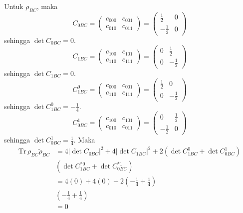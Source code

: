 Untuk $\rho_{BC}$, maka
\begin{equation}
	C_{0BC}=
	\begin{pmatrix}
		c_{000} & c_{001} \\
		c_{010} & c_{011}
	\end{pmatrix}=
	\begin{pmatrix}
		\frac{1}{2} & 0 \\
		-\frac{1}{2} & 0
	\end{pmatrix}
\end{equation}
sehingga $\det C_{0BC} = 0$.
\begin{equation}
	C_{1BC}=
	\begin{pmatrix}
		c_{100} & c_{101} \\
		c_{110} & c_{111}
	\end{pmatrix}=
	\begin{pmatrix}
		0 & \frac{1}{2} \\
		0 & -\frac{1}{2}
	\end{pmatrix}
\end{equation}
sehingga $\det C_{1BC} = 0$.
\begin{equation}
	C_{1BC}^0=
	\begin{pmatrix}
		c_{000} & c_{001} \\
		c_{110} & c_{111}
	\end{pmatrix}=
	\begin{pmatrix}
		\frac{1}{2} & 0 \\
		0 & -\frac{1}{2}
	\end{pmatrix}
\end{equation}
sehingga $\det C_{1BC}^0 = -\frac{1}{4}$.
\begin{equation}
	C_{0BC}^1=
	\begin{pmatrix}
		c_{100} & c_{101} \\
		c_{010} & c_{011}
	\end{pmatrix}=
	\begin{pmatrix}
		0 & \frac{1}{2} \\
		-\frac{1}{2} & 0
	\end{pmatrix}
\end{equation}
sehingga $\det C_{0BC}^1 = \frac{1}{4}$. Maka
\begin{equation}
	\begin{aligned}
		\mathrm{Tr}\,\rho_{BC}\tilde{\rho}_{BC}
		&=4|\det C_{0BC}|^2+4|\det C_{1BC}|^2+2(\det C_{1BC}^0+ \det C_{0BC}^1)\\
		&(\det C^{*0}_{1BC} + \det C^{*1}_{0BC})\\
		&=4(0)+4(0)+2(-\frac{1}{4}+\frac{1}{4})\\
		&(-\frac{1}{4}+\frac{1}{4})\\
		&=0
	\end{aligned}
\end{equation}

